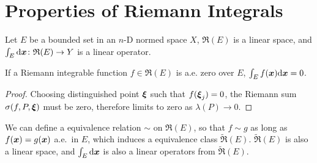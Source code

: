 \documentclass[openany]{book}
\begin{document}
\section{Properties of Riemann Integrals}

\begin{theorem}
		\label{theorem: integrals are linear operators}
	Let $E$ be a bounded set in an $n$-D normed space $X$, $\mathfrak R(E)$ is a linear space, and $\int_E \mathrm{d} \boldsymbol{x} \colon \mathfrak R(E) \to Y$ is a linear operator.
\end{theorem}

\begin{theorem}
	\label{theorem: integral is zero if a.e. zero}
	If a Riemann integrable function $f \in \mathfrak R(E)$ is a.e. zero over $E$, $\int_E f(\boldsymbol{x}) \mathrm{d} \boldsymbol{x} = 0$.
\end{theorem}
\begin{proof}
	Choosing distinguished point $\boldsymbol{\xi}$ such that $f(\boldsymbol{\xi}_j) = 0$, the Riemann sum $\sigma(f, P, \boldsymbol{\xi})$ must be zero, therefore limits to zero as $\lambda(P) \to 0$.
\end{proof}

We can define a equivalence relation $\sim$ on $\mathfrak R(E)$, so that $f \sim g$ as long as $f(\boldsymbol{x}) = g(\boldsymbol{x})$ a.e.\ in $E$, which induces a equivalence class $\tilde{\mathfrak R}(E)$. 
$\tilde{\mathfrak R}(E)$ is also a linear space, and $\int_E \mathrm{d} \boldsymbol{x}$ is also a linear operators from $\tilde{\mathfrak R}(E)$.
\end{document}
